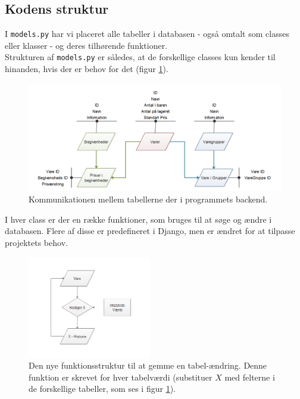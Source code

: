 \documentclass[]{article}
\begin{document}
\subsection{Kodens struktur}
I \texttt{models.py} har vi placeret alle tabeller i databasen - også omtalt som classes eller klasser - og deres tilhørende funktioner. \\
Strukturen af \texttt{models.py} er således, at de forskellige classes kun kender til hinanden, hvis der er behov for det (figur \ref{fig:database}).
\begin{figure} [H]
	\centering
	\includegraphics[width = \textwidth]{Database.png}
	\caption[Database]{Kommunikationen mellem tabellerne der i programmets backend.}
	\label{fig:database}
\end{figure}
 \noindent I hver class er der en række funktioner, som bruges til at søge og ændre i databasen. Flere af disse er predefineret i Django, men er ændret for at tilpasse projektets behov. \\
\begin{figure}
	\vspace{-25pt}
	\begin{center}
		\includegraphics [width=0.48\textwidth] {ChangeValue.png}
	\end{center}
	\vspace{-25pt}
	\caption[Funktionsstruktur for at gemme ændring i tabel]{Den nye funktionsstruktur til at gemme en tabel-ændring. Denne funktion er skrevet for hver tabelværdi (substituer $X$ med felterne i de forskellige tabeller, som ses i figur \ref{fig:database}).}
	\label{fig:Change}
\end{figure}
\end{document}
